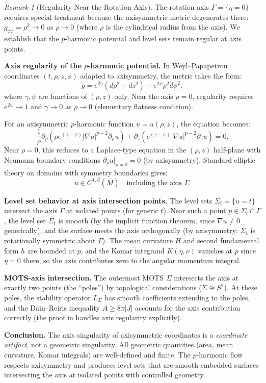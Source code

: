 \documentclass[12pt]{article}
\theoremstyle{plain}
\theoremstyle{definition}
\theoremstyle{remark}
\newtheorem{remark}[theorem]{Remark}
\newcommand{\tg}{\tilde{g}}
\newcommand{\Hoelder}{\beta}
\begin{document}
\begin{remark}[Regularity Near the Rotation Axis]\label{rem:axis-regularity}
The rotation axis $\Gamma = \{\eta = 0\}$ requires special treatment because the axisymmetric metric degenerates there: $g_{\phi\phi} = \rho^2 \to 0$ as $\rho \to 0$ (where $\rho$ is the cylindrical radius from the axis). We establish that the $p$-harmonic potential and level sets remain regular at axis points.

\textbf{Axis regularity of the $p$-harmonic potential.} In Weyl--Papapetrou coordinates $(t, \rho, z, \phi)$ adapted to axisymmetry, the metric takes the form:
\[
\tg = e^{2\gamma}(d\rho^2 + dz^2) + e^{2\psi}\rho^2 d\phi^2,
\]
where $\gamma, \psi$ are functions of $(\rho, z)$ only. Near the axis $\rho = 0$, regularity requires $e^{2\psi} \to 1$ and $\gamma \to 0$ as $\rho \to 0$ (elementary flatness condition).

For an axisymmetric $p$-harmonic function $u = u(\rho, z)$, the equation becomes:
\[
\frac{1}{\rho}\partial_\rho\left(\rho e^{(\gamma-\psi)}|\nabla u|^{p-2}\partial_\rho u\right) + \partial_z\left(e^{(\gamma-\psi)}|\nabla u|^{p-2}\partial_z u\right) = 0.
\]
Near $\rho = 0$, this reduces to a Laplace-type equation in the $(\rho, z)$ half-plane with Neumann boundary conditions $\partial_\rho u|_{\rho=0} = 0$ (by axisymmetry). Standard elliptic theory on domains with symmetry boundaries \cite{morecamping1980} gives:
\[
u \in C^{1,\Hoelder}(\overline{M}) \quad \text{including the axis } \Gamma.
\]

\textbf{Level set behavior at axis intersection points.} The level sets $\Sigma_t = \{u = t\}$ intersect the axis $\Gamma$ at isolated points (for generic $t$). Near such a point $p \in \Sigma_t \cap \Gamma$, the level set $\Sigma_t$ is smooth (by the implicit function theorem, since $\nabla u \neq 0$ generically), and the surface meets the axis orthogonally (by axisymmetry: $\Sigma_t$ is rotationally symmetric about $\Gamma$). The mean curvature $H$ and second fundamental form $h$ are bounded at $p$, and the Komar integrand $K(\eta, \nu)$ vanishes at $p$ since $\eta = 0$ there, so the axis contributes zero to the angular momentum integral.

\textbf{MOTS-axis intersection.} The outermost MOTS $\Sigma$ intersects the axis at exactly two points (the ``poles'') by topological considerations ($\Sigma \cong S^2$). At these poles, the stability operator $L_\Sigma$ has smooth coefficients extending to the poles, and the Dain--Reiris inequality $A \geq 8\pi|J|$ accounts for the axis contribution correctly (the proof in \cite{dain2011} handles axis regularity explicitly).

\textbf{Conclusion.} The axis singularity of axisymmetric coordinates is a \emph{coordinate artifact}, not a geometric singularity. All geometric quantities (area, mean curvature, Komar integrals) are well-defined and finite. The $p$-harmonic flow respects axisymmetry and produces level sets that are smooth embedded surfaces intersecting the axis at isolated points with controlled geometry.
\end{remark}
\end{document}
